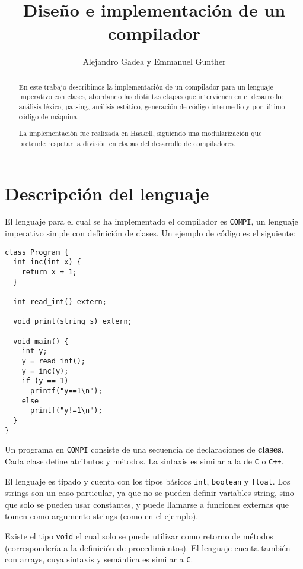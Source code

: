 \documentclass[a4paper,10pt]{article}
\title{Diseño e implementación de un compilador}
\author{Alejandro Gadea y Emmanuel Gunther}
\begin{document}
\maketitle


\begin{abstract}
\noindent
En este trabajo describimos la implementación de un compilador para un lenguaje
imperativo con clases, abordando las distintas etapas que intervienen en el desarrollo: 
análisis léxico, parsing, análisis estático, generación de código intermedio y por último
código de máquina.

\noindent
La implementación fue realizada en Haskell, siguiendo una modularización que pretende
respetar la división en etapas del desarrollo de compiladores.
\end{abstract}

\section{Descripción del lenguaje}

El lenguaje para el cual se ha implementado el compilador es \verb|COMPI|, un lenguaje imperativo
simple con definición de clases. Un ejemplo de código es el siguiente:

\begin{verbatim}
class Program {
  int inc(int x) {
    return x + 1;
  }

  int read_int() extern;

  void print(string s) extern;

  void main() {
    int y;
    y = read_int();
    y = inc(y);
    if (y == 1)
      printf("y==1\n");
    else
      printf("y!=1\n");
  }
}
\end{verbatim}


Un programa en \verb|COMPI| consiste de una secuencia de declaraciones de \textbf{clases}. Cada
clase define atributos y métodos. La sintaxis es similar a la de \verb|C| o \verb|C++|.

El lenguaje es tipado y cuenta con los tipos básicos \verb|int|, \verb|boolean| y \verb|float|. Los 
strings son un caso particular, ya que no se pueden definir variables string, sino que solo se pueden usar
constantes, y puede llamarse a funciones externas que tomen como argumento strings (como en el ejemplo).

Existe el tipo \verb|void| el cual solo se puede utilizar como retorno de métodos (correspondería a 
la definición de procedimientos). El lenguaje cuenta también con arrays, cuya sintaxis y semántica es similar a \verb|C|.
\end{document}
